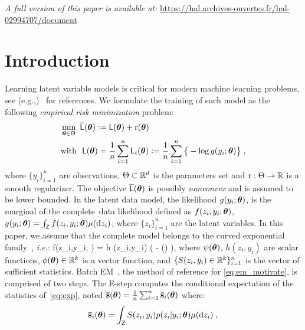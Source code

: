 \documentclass[conference,letterpaper]{IEEEtran}
\begin{document}
\textit{A full version of this paper is available at:}
\textcolor{magenta}{\url{https://hal.archives-ouvertes.fr/hal-02994707/document} }

\section{Introduction}


Learning latent variable models is critical for modern machine learning problems, see (e.g.,)~\cite{mclachlan2007algorithm} for references.
We formulate the training of such model as the following \emph{empirical risk minimization} problem:
\begin{align} \label{eq:em_motivate}
\begin{split} 
& \min_{ \param \in \Param }~ \overline{\calL} ( \param ) \eqdef  \calL ( \param ) + \Pen (\param)\\
& \text{with}~~\calL ( \param ) = \frac{1}{n} \sum_{i=1}^n \calL_i( \param) \eqdef  \frac{1}{n} \sum_{i=1}^n \big\{ - \log g( y_i ; \param ) \big\}\eqs,
\end{split} 
\end{align}
where $\{y_i\}_{i=1}^n$ are observations, $\Theta \subset \mathbb{R}^d$ is the parameters set and $\operatorname{r} : \Theta \rightarrow \mathbb{R}$ is a smooth regularizer.
The objective $ \overline{{\textsf{L}}} ( {\bm{\theta}} )$ is possibly \emph{nonconvex} and is assumed to be lower bounded. 
In the latent data model, the likelihood $g(y_i ; {\bm{\theta}})$, is the marginal of the complete~data likelihood defined as $f(z_i,y_i; {\bm{\theta}})$, $g(y_i; {\bm{\theta}}) = \int_{\mathsf{Z}} f (z_i,y_i;{\bm{\theta}}) \mu(\mathrm d z_i)$, where $\{ z_i \}_{i=1}^n$ are the latent variables.
In this paper, we assume that the complete model belongs to the curved exponential family~\cite{efron1975defining}, \textit{i.e.}:
\beq \label{eq:exp}
f(z_i,y_i; \param) = h  (z_i,y_i) \exp \big(  - \psi(\param) \big)\eqs,
\eeq
where $\psi({\bm{\theta}})$, $h(z_i,y_i)$ are scalar functions, $\phi({\bm{\theta}}) \in \mathbb{R}^k$ is a vector function, and $\{S(z_i,y_i) \in \mathbb{R}^k\}_{i=1}^n$ is the vector of sufficient statistics.
Batch EM~\cite{dempster1977Maximum, wu1983convergence}, the method of reference for \eqref{eq:em_motivate}, is comprised of two steps. 
The \textsf{E-step} computes the conditional expectation of the statistics of~\eqref{eq:exp}, noted $\overline{{\mathbf{s}}}({\bm{\theta}})= \frac{1}{n} \sum_{i=1}^n \overline{{\mathbf{s}}}_i({\bm{\theta}})$ where:
\begin{align}\label{eq:definition-overline-bss}
 \overline{\bss}_i(\param)= \int_{\Zset} S(z_i,y_i) p(z_i|y_i;\param) \mu(\rmd z_i) \eqsp,
\end{align}
\end{document}
